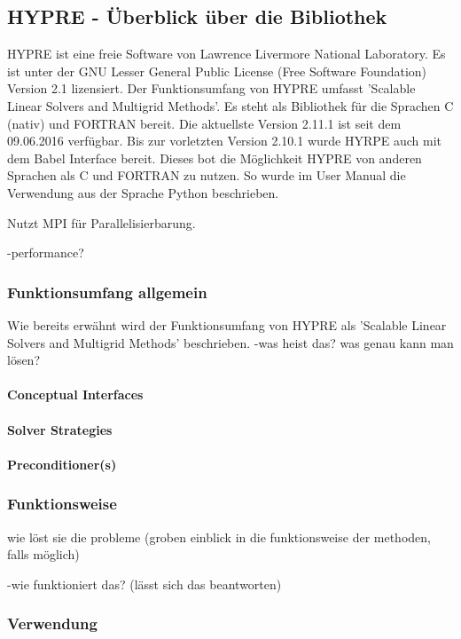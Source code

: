 \documentclass[a4paper,10pt]{article}
\begin{document}
\subsection{HYPRE - Überblick über die Bibliothek}

HYPRE ist eine freie Software von Lawrence Livermore National Laboratory.
Es ist unter der GNU Lesser General Public License (Free Software Foundation) Version 2.1 lizensiert.
Der Funktionsumfang von HYPRE umfasst 'Scalable Linear Solvers and Multigrid Methods'.
Es steht als Bibliothek für die Sprachen C (nativ) und FORTRAN bereit.
Die aktuellste Version 2.11.1 ist seit dem 09.06.2016 verfügbar.
Bis zur vorletzten Version 2.10.1 wurde HYRPE auch mit dem Babel Interface bereit.
Dieses bot die Möglichkeit HYPRE von anderen Sprachen als C und FORTRAN zu nutzen.
So wurde im User Manual die Verwendung aus der Sprache Python beschrieben.

Nutzt MPI für Parallelisierbarung.

-performance?

\subsubsection{Funktionsumfang allgemein}

Wie bereits erwähnt wird der Funktionsumfang von HYPRE als 'Scalable Linear Solvers and Multigrid Methods' beschrieben.
-was heist das? was genau kann man lösen?

\paragraph{Conceptual Interfaces}
\paragraph{Solver Strategies}
\paragraph{Preconditioner(s)}

\subsubsection{Funktionsweise}

wie löst sie die probleme (groben einblick in die funktionsweise der methoden, falls möglich)

-wie funktioniert das? (lässt sich das beantworten)

\subsubsection{Verwendung}
\end{document}
